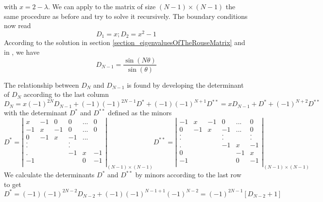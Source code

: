 \documentclass{paper}
\begin{document}
with $x=2-\lambda$. We can apply to the matrix of size $(N-1)\times (N-1)$ the same procedure as before and try to solve it recursively. The boundary conditions now read
\begin{equation*}
D_1 = x; D_2 = x^2-1
\end{equation*}
According to the solution in section \ref{section_eigenvaluesOfTheRouseMatrix} and in \cite{lin2011polymer}, we have 
\begin{equation*}
D_{N-1}= \frac{\sin(N\theta)}{\sin(\theta)}
\end{equation*}

The relationship between $D_N$ and $D_{N-1}$ is found by developing the determinant of $D_N$ according to the last column
\begin{equation*}
D_N = x(-1)^{2N}D_{N-1}+(-1)(-1)^{2N-1}D^*+(-1)(-1)^{N+1}D^{**}=xD_{N-1}+D^*+(-1)^{N+2}D^{**}
\end{equation*}
with the determinant $D^*$ and $D^{**}$ defined as the minors 
\begin{equation*}
D^*= 
\left| \begin{matrix}
 x  & -1 &  0 &  0  &... &  0 \\
-1  &  x & -1 &  0  &... &  0 \\
 0  & -1 &  x & -1  &... &    \\
 .  &    &    &  .  &    &    \\
 .  &    &    &  .  &    &    \\
 .  &    &    &  -1 &  x &-1  \\
 -1 &    &    &     &  0 &-1  \\   
\end{matrix}\right|_{(N-1)\times(N-1)} 
D^{**}=\left|\begin{matrix}
-1  &  x & -1 &  0  &...&  0 \\
 0  & -1 &  x & -1  &...&  0 \\
 .  &    &    &  .  &   &  . \\
 .  &    &    &  .  &   &  . \\
 .  &    &    &  -1 &  x& -1 \\
 0  &    &    &     & -1& x  \\
 -1 &    &    &     &  0&-1  \\   
\end{matrix} \right|_{(N-1)\times(N-1)}
\end{equation*}
We calculate the determinants $D^*$ and $D^{**}$ by minors according to the last row to get 
\begin{equation*}
D^* = (-1)(-1)^{2N-2}D_{N-2}+(-1)(-1)^{N-1+1}(-1)^{N-2}=(-1)^{2N-1}[D_{N-2}+1]
\end{equation*}
\end{document}
